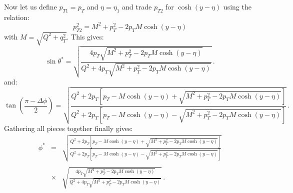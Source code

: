\documentclass[10pt,a4paper]{article}
\begin{document}
Now let us define $p_{T1}=p_T$ and $\eta=\eta_1$ and trade $p_{T2}$
for $\cosh(y-\eta)$ using the relation:
\begin{equation}
p_{T2}^2=M^2+p_T^2-2p_TM\cosh(y-\eta)
\end{equation}
with $M=\sqrt{Q^2+q_T^2}$. This gives:
\begin{equation}
\sin\theta^*=\sqrt{\frac{4p_{T}\sqrt{M^2+p_T^2-2p_TM\cosh(y-\eta)}}{Q^2 +4p_{T}\sqrt{M^2+p_T^2-2p_TM\cosh(y-\eta)}}}\,.
\end{equation}
and:
\begin{equation}
\tan\left(\frac{\pi-\Delta\phi}{2}\right) = \sqrt{\frac{Q^2+2p_T\left[p_T-M\cosh(y-\eta)+\sqrt{M^2+p_T^2-2p_TM\cosh(y-\eta)}\right]}{Q^2+2p_T\left[p_T-M\cosh(y-\eta)-\sqrt{M^2+p_T^2-2p_TM\cosh(y-\eta)}\right]}}\,.
\end{equation}
Gathering all pieces together finally gives:
\begin{equation}\label{eq:phistarmaster}
\begin{array}{rcl}
\phi^*&=&\displaystyle
          \sqrt{\frac{Q^2+2p_T\left[p_T-M\cosh(y-\eta)+\sqrt{M^2+p_T^2-2p_TM\cosh(y-\eta)}\right]}{Q^2+2p_T\left[p_T-M\cosh(y-\eta)-\sqrt{M^2+p_T^2-2p_TM\cosh(y-\eta)}\right]}}\\
\\
&\times& \displaystyle\sqrt{\frac{4p_{T}\sqrt{M^2+p_T^2-2p_TM\cosh(y-\eta)}}{Q^2 +4p_{T}\sqrt{M^2+p_T^2-2p_TM\cosh(y-\eta)}}}\,.
\end{array}
\end{equation}
\end{document}

